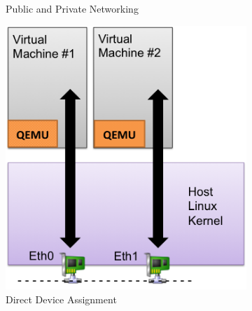 \begin{enumerate}
\begin{figure}
\begin{subfigure}[b]{0.35\textwidth}
                \caption{Public and Private Networking}
                \label{fig:kvm-internal}
        \end{subfigure}
        \quad \hspace{8 mm}
        \begin{subfigure}[b]{0.35\textwidth}
                \includegraphics[width=\textwidth]{kvm-direct.png}
                \caption{Direct Device Assignment}
                \label{fig:kvm-direct}
        \end{subfigure}
\newline \newline
        \begin{subfigure}[b]{0.42\textwidth}

\end{subfigure}
\end{figure}
\end{enumerate}
